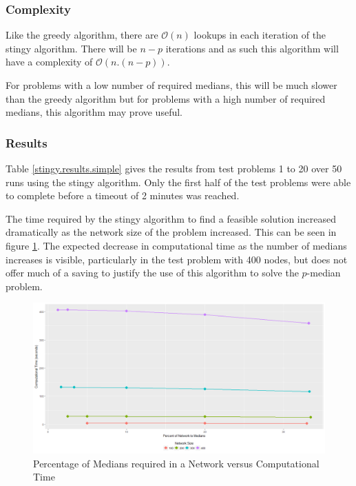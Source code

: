 \documentclass[11pt]{article}
\begin{document}
	
	\subsubsection{Complexity}
	Like the greedy algorithm, there are $\mathcal{O}(n)$ lookups in each iteration of the stingy algorithm.  There will be $n-p$ iterations and as such this algorithm will have a complexity of $\mathcal{O}(n.(n-p))$.
	
	For problems with a low number of required medians, this will be much slower than the greedy algorithm but for problems with a high number of required medians, this algorithm may prove useful.
	
	\subsubsection{Results}
	Table \ref{stingy.results.simple} gives the results from test problems 1 to 20 over 50 runs using the stingy algorithm.  Only the first half of the test problems were able to complete before a timeout of 2 minutes was reached.
	
	The time required by the stingy algorithm to find a feasible solution increased dramatically as the network size of the problem increased.  This can be seen in figure \ref{percentmedvstime_stingy}.  The expected decrease in computational time as the number of medians increases is visible, particularly in the test problem with 400 nodes, but does not offer much of a saving to justify the use of this algorithm to solve the $p$-median problem.	
	
		\begin{figure}[H]
			\begin{center}
				\includegraphics[width=14cm]{percentmedvstime_stingy.png}
				\caption{Percentage of Medians required in a Network versus Computational Time}
				\label{percentmedvstime_stingy}
			\end{center}
		\end{figure}
		
\end{document}
